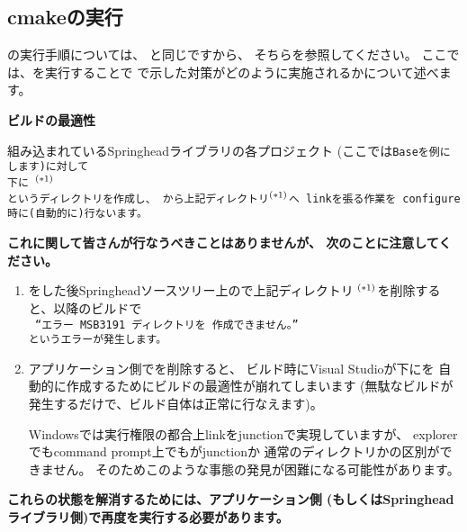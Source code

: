 \subsection{cmakeの実行}
\label{subsec:CmakeApplication}

\noindent
\cmake の実行手順については、
と同じですから、
そちらを参照してください。
ここでは、\cmake を実行することで
で示した対策がどのように実施されるかについて述べます。

\bigskip
\noindent
\bf{ビルドの最適性}
\begin{narrow}[20pt]
	組み込まれているSpringheadライブラリの各プロジェクト
	(ここでは\tt{Base}を例にします)に対して\\
	\hspace{20pt}下に
	$^{\small (*1)}$\\
	というディレクトリを作成し、
	から上記ディレクトリ$^{\small (*1)}$へ
	linkを張る作業を\cmake\ configure時に(自動的に)行ないます。
\end{narrow}	
\medskip
\begin{narrow}[20pt]
	\thinrule{\linewidth}
	{\bf{これに関して皆さんが行なうべきことはありませんが、
	次のことに注意してください。}}

	\medskip
	\begin{enumerate}
	  \item	\cmake をした後Springheadソースツリー上ので上記ディレクトリ
		$^{\small (*1)}$を削除すると、以降のビルドで\\
		\tt{\small{%
		``エラー MSB3191 ディレクトリを
		作成できません。''}}\\
		というエラーが発生します。

	  \item	アプリケーション側でを削除すると、
		ビルド時にVisual Studioが\build 下にを
		自動的に作成するためにビルドの最適性が崩れてしまいます
		(無駄なビルドが発生するだけで、ビルド自体は正常に行なえます)。
		\begin{narrow}[s][15pt]
		Windowsでは実行権限の都合上linkをjunctionで実現していますが、
		explorerでもcommand prompt上でもがjunctionか
		通常のディレクトリかの区別ができません。
		そのためこのような事態の発見が困難になる可能性があります。
		\end{narrow}
	\end{enumerate}
	{\bf{これらの状態を解消するためには、アプリケーション側
	(もしくはSpringheadライブラリ側)で再度\cmake を実行する必要があります。}}

	\thinrule{\linewidth}
\end{narrow}

